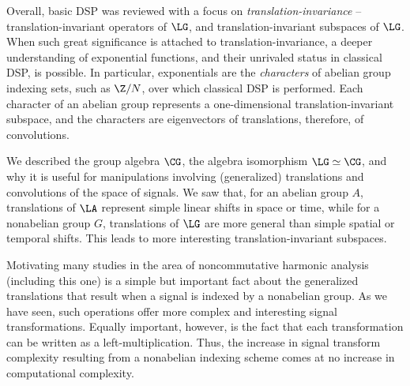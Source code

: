 Overall, basic DSP was reviewed with a focus on 
\emph{translation-invariance} -- translation-invariant
operators of $\LG$, and translation-invariant
subspaces of $\LG$. 
When such great significance is attached to translation-invariance, 
a deeper understanding of exponential functions, and their 
unrivaled status in classical DSP, is possible.  
In particular, exponentials are the \emph{characters} 
of abelian group indexing sets, such as $\Z/N$, over which
classical DSP is performed.  
Each character of an abelian group represents a one-dimensional
translation-invariant subspace, and the characters are eigenvectors
of translations, therefore, of convolutions. 

We described the group algebra $\CG$,
the algebra isomorphism $\LG \simeq \CG$, and why it is
useful for manipulations involving (generalized)
translations and convolutions of the space of signals. 
We saw that, for an abelian group $A$, translations of $\LA$
represent simple linear shifts in space or time, while for a nonabelian
group $G$, translations of $\LG$ are more general than
simple spatial or temporal shifts.  This leads to
more interesting translation-invariant subspaces.

Motivating many studies in the area of noncommutative
harmonic analysis (including this one) is a simple
but important fact about the generalized translations that
result when a signal is indexed by a nonabelian group.
As we have seen, such operations offer more complex and
interesting signal transformations.  Equally important,
however, is the fact that each transformation can be written
as a left-multiplication. Thus, the increase in signal transform
complexity resulting from a nonabelian indexing scheme
comes at no increase in computational complexity. 


